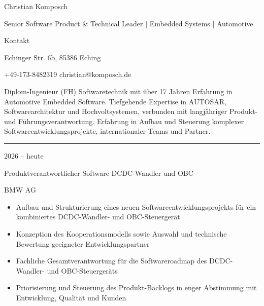 \documentclass[a4paper,10pt]{article}
\newlength{\cvcolumngapwidth}
\newlength{\cvleftcolumnwidth}
\newlength{\cvrightcolumnwidth}
\newcommand{\cvnamestyle}[1]{{\Large\cvnamefont\textcolor{cvnamecolor}{#1}}}
\newcommand{\cvsectionstyle}[1]{{\normalsize\cvsectionfont\textcolor{cvsectioncolor}{#1}}}
\newcommand{\cvtitlestyle}[1]{{\large\cvtitlefont\textcolor{cvtitlecolor}{#1}}}
\newcommand{\cvdurationstyle}[1]{{\small\cvdurationfont\textcolor{cvdurationcolor}{#1}}}
\newcommand{\cvheadingstyle}[1]{{\normalsize\cvheadingfont\textcolor{cvheadingcolor}{#1}}}
\newlength{\cvafteritemskipamount}
\newlength{\cvaftersectionskipamount}
\newlength{\cvafternameskipamount}
\newlength{\cvaftertitleskipamount}
\newlength{\cvparskip}
\newcommand{\cvpersonalinfo}[2]{
    \begin{minipage}[t]{\cvleftcolumnwidth}
        \vspace{0mm} %
        \raggedleft #1
    \end{minipage}%
    \hspace{\cvcolumngapwidth}%
    \begin{minipage}[t]{\cvrightcolumnwidth}
        \vspace{0mm} %
        #2
    \end{minipage}

    \vspace{\cvafteritemskipamount}
}
\newcommand{\cvname}[1]{
    \cvnamestyle{#1}

    \vspace{\cvafternameskipamount}
}
\newcommand{\cvsection}[1]{
    \begin{minipage}[t]{\cvleftcolumnwidth}
        \raggedleft\cvsectionstyle{#1}
    \end{minipage}%
    \hspace{\cvcolumngapwidth}%
    \begin{minipage}[t]{\cvrightcolumnwidth}
        \textcolor{cvrulecolor}{\rule{\cvrightcolumnwidth}{0.3mm}}
    \end{minipage}

    \vspace{\cvaftersectionskipamount}
}
\newcommand{\cvitem}[2]{
    \begin{minipage}[t]{\cvleftcolumnwidth}
        \raggedleft #1
    \end{minipage}%
    \hspace{\cvcolumngapwidth}%
    \begin{minipage}[t]{\cvrightcolumnwidth}
        \setlength{\parskip}{\cvparskip} #2
    \end{minipage}

    \vspace{\cvafteritemskipamount}
}
\newcommand{\cvtitle}[1]{
    \cvtitlestyle{#1}

    \vspace{\cvaftertitleskipamount}
    \vspace{-\cvparskip}
}
\newcommand{\cvprofilestyle}[1]{
    {\normalsize\cvheadingfont\textcolor{cvmaincolor}{#1}}
    }
\begin{document}

\cvpersonalinfo{
    \fbox{%
        \begin{minipage}[c][38mm][c]{28mm}
            \centering
            FOTO
        \end{minipage}%
    }
}{
    \cvname{Christian Komposch}

    \cvprofilestyle{Senior Software Product \& Technical Leader | Embedded Systems | Automotive}

    \vspace{2mm}

    \cvheadingstyle{Kontakt}

    Echinger Str. 6b, 85386 Eching

    +49-173-8482319 \quad christian@komposch.de

    \vspace{2mm}

    Diplom-Ingenieur (FH) Softwaretechnik mit über 17 Jahren Erfahrung in Automotive Embedded Software. Tiefgehende Expertise in AUTOSAR, Softwarearchitektur und Hochvoltsystemen, verbunden mit langjähriger Produkt- und Führungsverantwortung. Erfahrung in Aufbau und Steuerung komplexer Softwareentwicklungsprojekte, internationaler Teams und Partner.
}



\cvsection{BERUFSERFAHRUNG}

\cvitem{
    \cvdurationstyle{2026 -- heute}
}{
    \cvtitle{Produktverantwortlicher Software DCDC-Wandler und OBC}

    BMW AG

    \begin{itemize}[leftmargin=*]
        \item Aufbau und Strukturierung eines neuen Softwareentwicklungsprojekts für ein kombiniertes DCDC-Wandler- und OBC-Steuergerät
        \item Konzeption des Kooperationsmodells sowie Auswahl und technische Bewertung geeigneter Entwicklungspartner
        \item Fachliche Gesamtverantwortung für die Softwareroadmap des DCDC-Wandler- und OBC-Steuergeräts
        \item Priorisierung und Steuerung des Produkt-Backlogs in enger Abstimmung mit Entwicklung, Qualität und Kunden
    \end{itemize}
}
\end{document}
